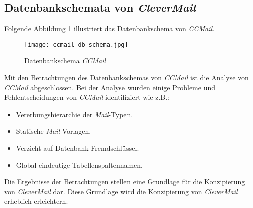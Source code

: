 \subsection{Datenbankschemata von \emph{CleverMail}}
Folgende Abbildung \ref{fig:ccmail-db-schema} illustriert das Datenbankschema von \emph{CCMail}.
\begin{figure}[H]
\centering
\texttt{[image: ccmail\_db\_schema.jpg]} 
\caption{Datenbankschema \emph{CCMail}}
\label{fig:ccmail-db-schema}
\end{figure}
Mit den Betrachtungen des Datenbankschemas von \emph{CCMail} ist die Analyse von \emph{CCMail} abgeschlossen. Bei der Analyse wurden einige Probleme und Fehlentscheidungen von \emph{CCMail} identifiziert wie z.B.:
\begin{itemize}
	\item Vererbungshierarchie der \emph{Mail}-Typen.
	\item Statische \emph{Mail}-Vorlagen.
	\item Verzicht auf Datenbank-Fremdschlüssel.
	\item Global eindeutige Tabellenspaltennamen.
\end{itemize}
Die Ergebnisse der Betrachtungen stellen eine Grundlage für die Konzipierung von \emph{CleverMail} dar. Diese Grundlage wird die Konzipierung von \emph{CleverMail} erheblich erleichtern.